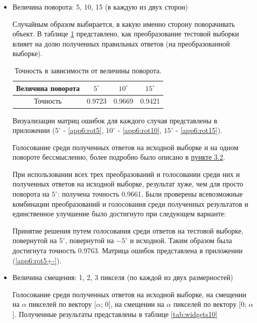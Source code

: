 \documentclass{article}
\begin{document}
\begin{itemize}
    \item Величина поворота: 5, 10, 15 (в каждую из двух сторон)
    
    Случайным образом выбирается, в какую именно сторону поворачивать объект.
    В таблице \ref{tab:widgets9} представлено, как преобразование тестовой выборки влияет на долю полученных правильных ответов (на преобразованной выборке).
    
    \begin{table}[h]
    \begin{center}
    \begin{tabular}{|*{4}{c|}}\hline
    Величина поворота & $ 5 ^\circ$  & $10 ^\circ$ & $15 ^\circ$ \\\hline
    Точность &  0.9723 &  0.9669 & 0.9421 \\\hline
    \end{tabular}
    \caption{\label{tab:widgets9} Точность в зависимости от величины поворота.}
    \end{center}
    \end{table}
    
    Визуализации матриц ошибок для каждого случая представлены в приложении ($ 5 ^\circ$ - \ref{app6:rot5}, $10 ^\circ$ - \ref{app6:rot10}, $15 ^\circ$ - \ref{app6:rot15}).
    
    Голосование среди полученных ответов на исходной выборке и на одном повороте бессмысленно, более подробно было описано в \hyperlink{3.2}{пункте 3.2}.
    
    При использовании всех трех преобразований и голосовании среди них и полученных ответов на исходной выборке, результат хуже, чем для просто поворота на $ 5 ^\circ$: получена точность 0.9661.
    Были проверены всевозможные комбинации преобразований и голосования среди полученных результатов и единственное улучшение было достигнуто при следующем варианте: 
    
    Принятие решения путем голосования среди ответов на тестовой выборке, повернутой на $ 5 ^\circ$, повернутой на $ -5 ^\circ$ и исходной. Таким образом была достигнута точность 0.9763. Матрица ошибок представлена в приложении (\ref{app6:rot5+-}).
    
    \item Величина смещения: 1, 2, 3 пикселя (по каждой из двух размерностей)
    
    Голосование среди полученных ответов на исходной выборке, на смещении на $\alpha$ пикселей по вектору [$\alpha$; 0], на смещении на $\alpha$ пикселей по вектору [0; $\alpha$]. Полученные результаты представлены в таблице \ref{tab:widgets10}
    

\end{itemize}
\end{document}

